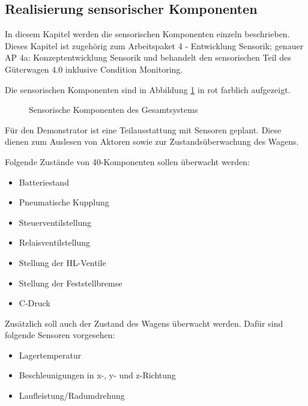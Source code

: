 \subsection{Realisierung sensorischer Komponenten}
In diesem Kapitel werden die sensorischen Komponenten einzeln beschrieben. Dieses Kapitel ist zugehörig zum Arbeitspaket 4 - Entwicklung Sensorik; genauer AP 4a: Konzeptentwicklung Sensorik und behandelt den sensorischen Teil des Güterwagen 4.0 inklusive Condition Monitoring.\par
Die sensorischen Komponenten sind in Abbildung \ref{fig:sKomp} in rot farblich aufgezeigt.
\begin{figure}[hbt]
    \centering
    
    \caption{Sensorische Komponenten des Gesamtsystems}
    \label{fig:sKomp}
\end{figure}
Für den Demonstrator ist eine Teilausstattung mit Sensoren geplant. Diese dienen zum Auslesen von Aktoren sowie zur Zustandsüberwachung des Wagens.\par
Folgende Zustände von \gls{40-Komponenten} sollen überwacht werden:
\begin{itemize}
    \item Batteriestand
    \item Pneumatische Kupplung
    \item Steuerventilstellung
    \item Relaisventilstellung
    \item Stellung der HL-Ventile
    \item Stellung der Feststellbremse
    \item C-Druck
\end{itemize}
Zusätzlich soll auch der Zustand des Wagens überwacht werden. Dafür sind folgende Sensoren vorgesehen:
\begin{itemize}
    \item Lagertemperatur
    \item Beschleunigungen in x-, y- und z-Richtung
    \item Laufleistung/Radumdrehung
\end{itemize}

\begin{comment}
\subsection{Konzept}
Condition Monitoring\\
Laderaumtemperatur\\
Türüberwachung\\
Stöße\\
Flachstellendetektion\\
Geschwindikeit\\
Laufleistung\\
Bremsbelag\\
Temperaturen\\
Batteriestand
\end{comment}

